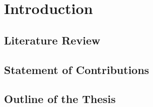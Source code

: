 

\chapter{Introduction}
\section{Literature Review}

\section{Statement of Contributions}

\section{Outline of the Thesis}

